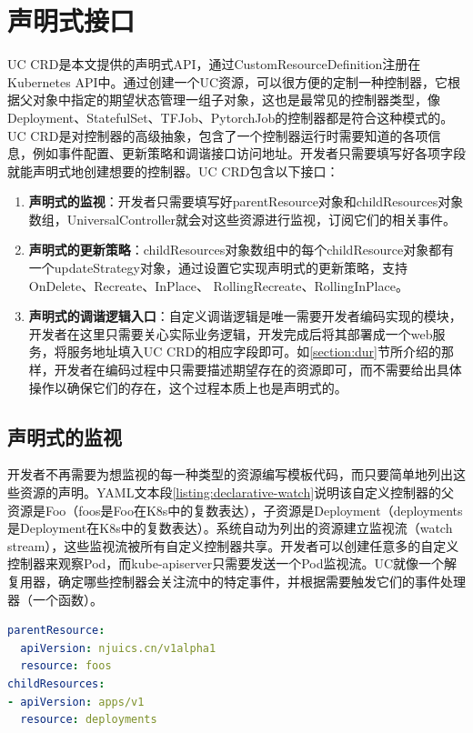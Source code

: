\documentclass[macfonts,master]{njuthesis}
\begin{document}
\section{声明式接口}

UC CRD是本文提供的声明式API，通过CustomResourceDefinition注册在Kubernetes API中。通过创建一个UC资源，可以很方便的定制一种控制器，它根据父对象中指定的期望状态管理一组子对象，这也是最常见的控制器类型，像Deployment、StatefulSet、TFJob、PytorchJob的控制器都是符合这种模式的。UC CRD是对控制器的高级抽象，包含了一个控制器运行时需要知道的各项信息，例如事件配置、更新策略和调谐接口访问地址。开发者只需要填写好各项字段就能声明式地创建想要的控制器。UC CRD包含以下接口：

\begin{enumerate}
	\item \textbf{声明式的监视}：开发者只需要填写好parentResource对象和childResources对象数组，UniversalController就会对这些资源进行监视，订阅它们的相关事件。
	\item \textbf{声明式的更新策略}：childResources对象数组中的每个childResource对象都有一个updateStrategy对象，通过设置它实现声明式的更新策略，支持OnDelete、Recreate、InPlace、 RollingRecreate、RollingInPlace。
	\item \textbf{声明式的调谐逻辑入口}：自定义调谐逻辑是唯一需要开发者编码实现的模块，开发者在这里只需要关心实际业务逻辑，开发完成后将其部署成一个web服务，将服务地址填入UC CRD的相应字段即可。如\ref{section:dur}节所介绍的那样，开发者在编码过程中只需要描述期望存在的资源即可，而不需要给出具体操作以确保它们的存在，这个过程本质上也是声明式的。
\end{enumerate}

\subsection{声明式的监视}

开发者不再需要为想监视的每一种类型的资源编写模板代码，而只要简单地列出这些资源的声明。YAML文本段\ref{listing:declarative-watch}说明该自定义控制器的父资源是Foo（foos是Foo在K8s中的复数表达），子资源是Deployment（deployments是Deployment在K8s中的复数表达）。系统自动为列出的资源建立监视流（watch stream），这些监视流被所有自定义控制器共享。开发者可以创建任意多的自定义控制器来观察Pod，而kube-apiserver只需要发送一个Pod监视流。UC就像一个解复用器，确定哪些控制器会关注流中的特定事件，并根据需要触发它们的事件处理器（一个函数）。
\begin{lstlisting}[language=yaml,caption=声明式的监视,label=listing:declarative-watch]
parentResource:
  apiVersion: njuics.cn/v1alpha1
  resource: foos
childResources:
- apiVersion: apps/v1
  resource: deployments
\end{lstlisting}
\end{document}
